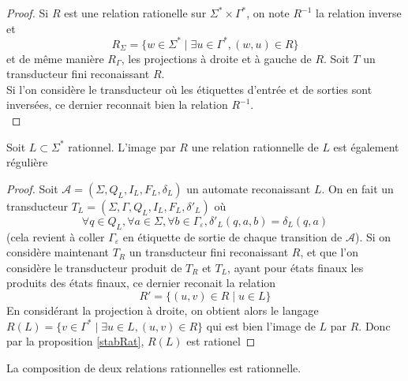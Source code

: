 \documentclass{scrartcl}
\begin{document}
\begin{flushleft}
\begin{proof}
    Si $R$ est une relation rationelle sur $\Sigma^* \times \Gamma^*$, on note $R^{-1}$ la relation inverse et
    \[ R_{\Sigma} = \{ w \in \Sigma^* \mid \exists u \in \Gamma^*, (w, u) \in R \} \]
    et de même manière $R_{\Gamma}$, les projections à droite et à gauche de $R$. Soit $T$ un transducteur fini reconaissant $R$.\\
    Si l'on considère le transducteur où les étiquettes d'entrée et de sorties sont inversées, ce dernier reconnait bien la
    relation $R^{-1}$.\\
\end{proof}

\begin{prop} \label{imageRat}
    Soit $L \subset \Sigma^*$ rationnel. L'image par $R$ une relation rationnelle de $L$ est également régulière
\end{prop}

\begin{proof}
    Soit $\mathcal{A} = (\Sigma, Q_L, I_L, F_L, \delta_L)$ un automate reconaissant $L$. On en fait un transducteur
    $T_L = (\Sigma, \Gamma, Q_L, I_L, F_L, \delta'_L)$ où
    \[ \forall q \in Q_L, \forall a \in \Sigma, \forall b \in \Gamma_{\varepsilon}, \delta'_L(q, a, b) = \delta_L(q, a) \]
    (cela revient à coller $\Gamma_{\varepsilon}$ en étiquette de sortie de chaque transition de $\mathcal{A}$). Si on considère
    maintenant $T_R$ un transducteur fini reconaissant $R$, et que l'on considère le transducteur produit de $T_R$ et $T_L$,
    ayant pour états finaux les produits des états finaux, ce dernier reconait la relation
    \[ R' = \{ (u, v) \in R \mid u \in L \} \]
    En considérant la projection à droite, on obtient alors le langage $R(L) = \{ v \in \Gamma^* \mid \exists u \in L, (u, v) \in R \}$
    qui est bien l'image de $L$ par $R$. Donc par la proposition \ref{stabRat}, $R(L)$ est rationel
\end{proof}

\begin{prop}[Composition]
    La composition de deux relations rationnelles est rationnelle.
\end{prop}


\end{flushleft}
\end{document}
